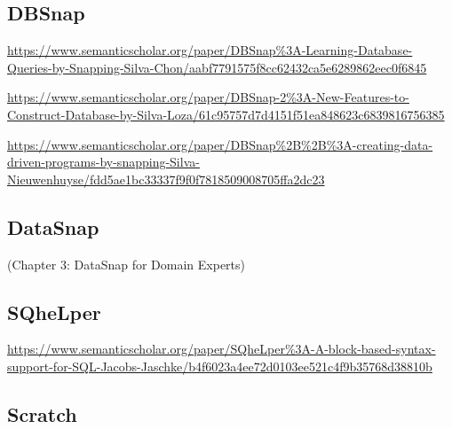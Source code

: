 \documentclass[oneside,a4paper,11pt,openright]{scrreprt}
\begin{document}
\clearpage



% 



\clearpage


\subsection{DBSnap}
\parencite{silvaDBSnapLearning2015}
\url{https://www.semanticscholar.org/paper/DBSnap\%3A-Learning-Database-Queries-by-Snapping-Silva-Chon/aabf7791575f8cc62432ca5e6289862eec0f6845}

\url{https://www.semanticscholar.org/paper/DBSnap-2\%3A-New-Features-to-Construct-Database-by-Silva-Loza/61c95757d7d4151f51ea848623c6839816756385}

\url{https://www.semanticscholar.org/paper/DBSnap\%2B\%2B\%3A-creating-data-driven-programs-by-snapping-Silva-Nieuwenhuyse/fdd5ae1bc33337f9f0f7818509008705ffa2dc23}

\subsection{DataSnap}
\parencite{hellmannDataSnapEnabling2015} (Chapter 3: DataSnap for Domain Experts)

\subsection{SQheLper}
\parencite{jacobsSQheLperBlockbased2021}
\url{https://www.semanticscholar.org/paper/SQheLper\%3A-A-block-based-syntax-support-for-SQL-Jacobs-Jaschke/b4f6023a4ee72d0103ee521c4f9b35768d38810b}
\subsection{Scratch}









\clearpage





\end{document}
